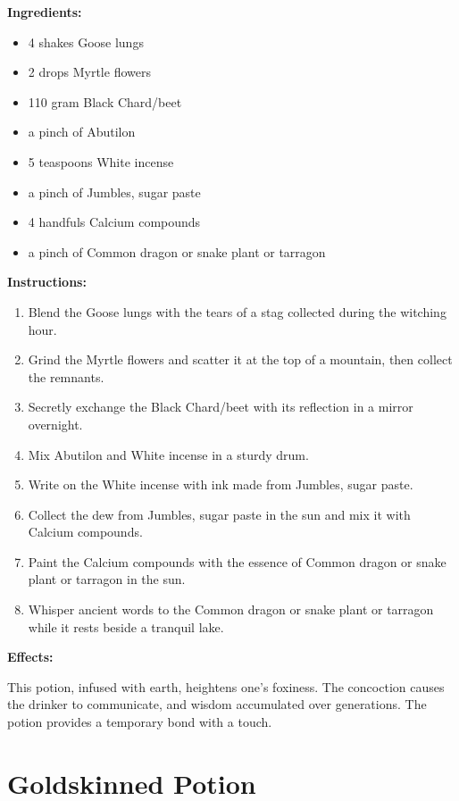 \documentclass{article}
\begin{document}
\textbf{Ingredients:}

\begin{itemize}
  \item 4 shakes Goose lungs
  \item 2 drops Myrtle flowers
  \item 110 gram Black Chard/beet
  \item a pinch of Abutilon
  \item 5 teaspoons White incense
  \item a pinch of Jumbles, sugar paste
  \item 4 handfuls Calcium compounds
  \item a pinch of Common dragon or snake plant or tarragon
\end{itemize}

\textbf{Instructions:}

\begin{enumerate}
  \item Blend the Goose lungs with the tears of a stag collected during the witching hour.
  \item Grind the Myrtle flowers and scatter it at the top of a mountain, then collect the remnants.
  \item Secretly exchange the Black Chard/beet with its reflection in a mirror overnight.
  \item Mix Abutilon and White incense in a sturdy drum.
  \item Write on the White incense with ink made from Jumbles, sugar paste.
  \item Collect the dew from Jumbles, sugar paste in the sun and mix it with Calcium compounds.
  \item Paint the Calcium compounds with the essence of Common dragon or snake plant or tarragon in the sun.
  \item Whisper ancient words to the Common dragon or snake plant or tarragon while it rests beside a tranquil lake.
\end{enumerate}

\textbf{Effects:}

This potion, infused with earth, heightens one's foxiness. The concoction causes the drinker to communicate, and wisdom accumulated over generations. The potion provides a temporary bond with a touch.

\newpage
\section*{Goldskinned Potion}
\end{document}
